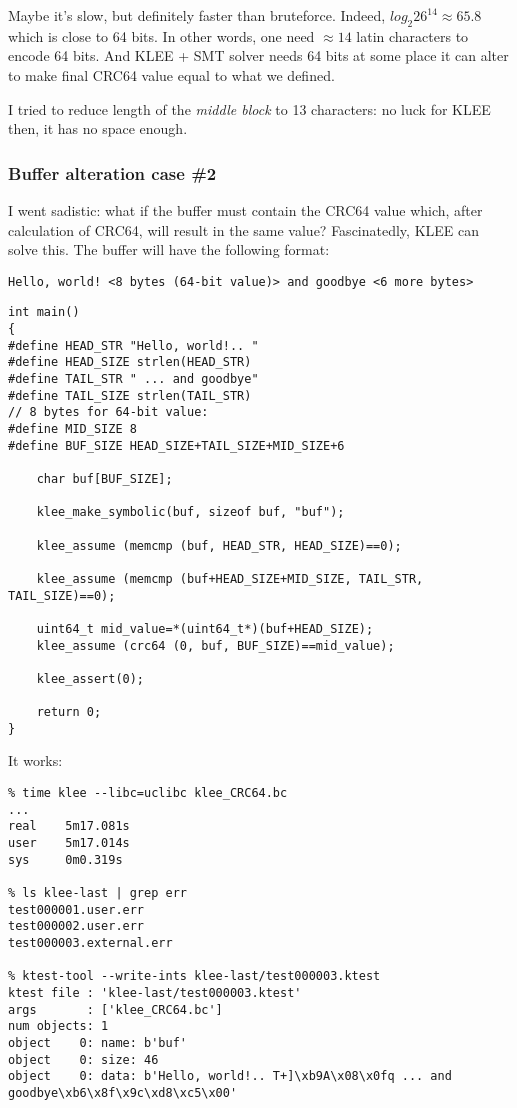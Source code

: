 Maybe it's slow, but definitely faster than bruteforce.
Indeed, $log_2{26^{14}} \approx 65.8$
which is close to 64 bits.
In other words, one need $\approx 14$ latin characters to encode 64 bits.
And KLEE + \ac{SMT} solver needs 64 bits at some place it can alter to make final CRC64 value equal to what we defined.

I tried to reduce length of the \textit{middle block} to 13 characters: no luck for KLEE then, it has no space enough.

\subsubsection{Buffer alteration case \#2}

I went sadistic: what if the buffer must contain the CRC64 value which, after calculation of CRC64, will result in the same value?
Fascinatedly, KLEE can solve this.
The buffer will have the following format:

\begin{lstlisting}
Hello, world! <8 bytes (64-bit value)> and goodbye <6 more bytes>
\end{lstlisting}

\begin{lstlisting}
int main()
{
#define HEAD_STR "Hello, world!.. "
#define HEAD_SIZE strlen(HEAD_STR)
#define TAIL_STR " ... and goodbye"
#define TAIL_SIZE strlen(TAIL_STR)
// 8 bytes for 64-bit value:
#define MID_SIZE 8
#define BUF_SIZE HEAD_SIZE+TAIL_SIZE+MID_SIZE+6

	char buf[BUF_SIZE];
  
	klee_make_symbolic(buf, sizeof buf, "buf");

	klee_assume (memcmp (buf, HEAD_STR, HEAD_SIZE)==0);

	klee_assume (memcmp (buf+HEAD_SIZE+MID_SIZE, TAIL_STR, TAIL_SIZE)==0);
	
	uint64_t mid_value=*(uint64_t*)(buf+HEAD_SIZE);
	klee_assume (crc64 (0, buf, BUF_SIZE)==mid_value);

	klee_assert(0);

	return 0;
}
\end{lstlisting}

It works:

\begin{lstlisting}
% time klee --libc=uclibc klee_CRC64.bc
...
real    5m17.081s
user    5m17.014s
sys     0m0.319s

% ls klee-last | grep err
test000001.user.err
test000002.user.err
test000003.external.err

% ktest-tool --write-ints klee-last/test000003.ktest
ktest file : 'klee-last/test000003.ktest'
args       : ['klee_CRC64.bc']
num objects: 1
object    0: name: b'buf'
object    0: size: 46
object    0: data: b'Hello, world!.. T+]\xb9A\x08\x0fq ... and goodbye\xb6\x8f\x9c\xd8\xc5\x00'
\end{lstlisting}

